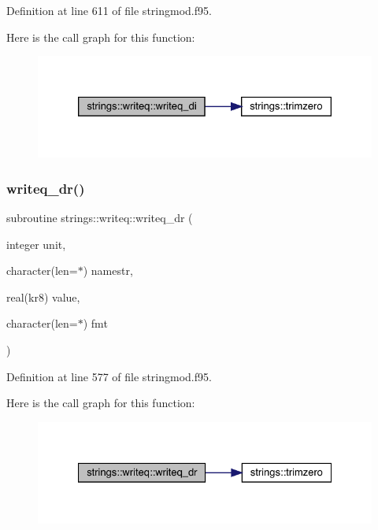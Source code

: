 Definition at line 611 of file stringmod.\+f95.

Here is the call graph for this function\+:\nopagebreak
\begin{figure}[H]
\begin{center}
\leavevmode
\includegraphics[width=326pt]{interfacestrings_1_1writeq_a19d50dea30fcb08479b3ec0626c58f69_cgraph}
\end{center}
\end{figure}
\mbox{\label{interfacestrings_1_1writeq_a141904a2ffb98125035f6ce0944ffd4c}} 
\subsubsection{\texorpdfstring{writeq\+\_\+dr()}{writeq\_dr()}}
{\footnotesize\ttfamily subroutine strings\+::writeq\+::writeq\+\_\+dr (\begin{DoxyParamCaption}\item[{integer}]{unit,  }\item[{character(len=$\ast$)}]{namestr,  }\item[{real(kr8)}]{value,  }\item[{character(len=$\ast$)}]{fmt }\end{DoxyParamCaption})}



Definition at line 577 of file stringmod.\+f95.

Here is the call graph for this function\+:\nopagebreak
\begin{figure}[H]
\begin{center}
\leavevmode
\includegraphics[width=327pt]{interfacestrings_1_1writeq_a141904a2ffb98125035f6ce0944ffd4c_cgraph}
\end{center}
\end{figure}
\mbox{\label{interfacestrings_1_1writeq_af7f414c54607f15965a0e67c7702aa9c}} 

